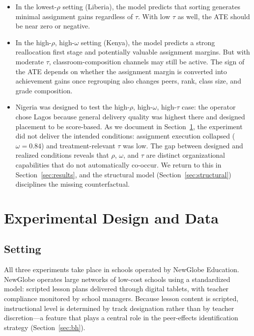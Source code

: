 \documentclass[11pt]{article}
\begin{document}
\begin{itemize}
\item In the lowest-$\rho$ setting (Liberia), the model predicts that sorting generates minimal assignment gains regardless of $\tau$. With low $\tau$ as well, the ATE should be near zero or negative.

\item In the high-$\rho$, high-$\omega$ setting (Kenya), the model predicts a strong reallocation first stage and potentially valuable assignment margins. But with moderate $\tau$, classroom-composition channels may still be active. The sign of the ATE depends on whether the assignment margin is converted into achievement gains once regrouping also changes peers, rank, class size, and grade composition.

\item Nigeria was designed to test the high-$\rho$, high-$\omega$, high-$\tau$ case: the operator chose Lagos because general delivery quality was highest there and designed placement to be score-based. As we document in Section~\ref{sec:design}, the experiment did not deliver the intended conditions: assignment execution collapsed ($\omega = 0.84$) and treatment-relevant $\tau$ was low. The gap between designed and realized conditions reveals that $\rho$, $\omega$, and $\tau$ are distinct organizational capabilities that do not automatically co-occur. We return to this in Section~\ref{sec:results}, and the structural model (Section~\ref{sec:structural}) disciplines the missing counterfactual.
\end{itemize}


\section{Experimental Design and Data}
\label{sec:design}

\subsection{Setting}

All three experiments take place in schools operated by NewGlobe Education. NewGlobe operates large networks of low-cost schools using a standardized model: scripted lesson plans delivered through digital tablets, with teacher compliance monitored by school managers. Because lesson content is scripted, instructional level is determined by track designation rather than by teacher discretion---a feature that plays a central role in the peer-effects identification strategy (Section~\ref{sec:bh}).
\end{document}
